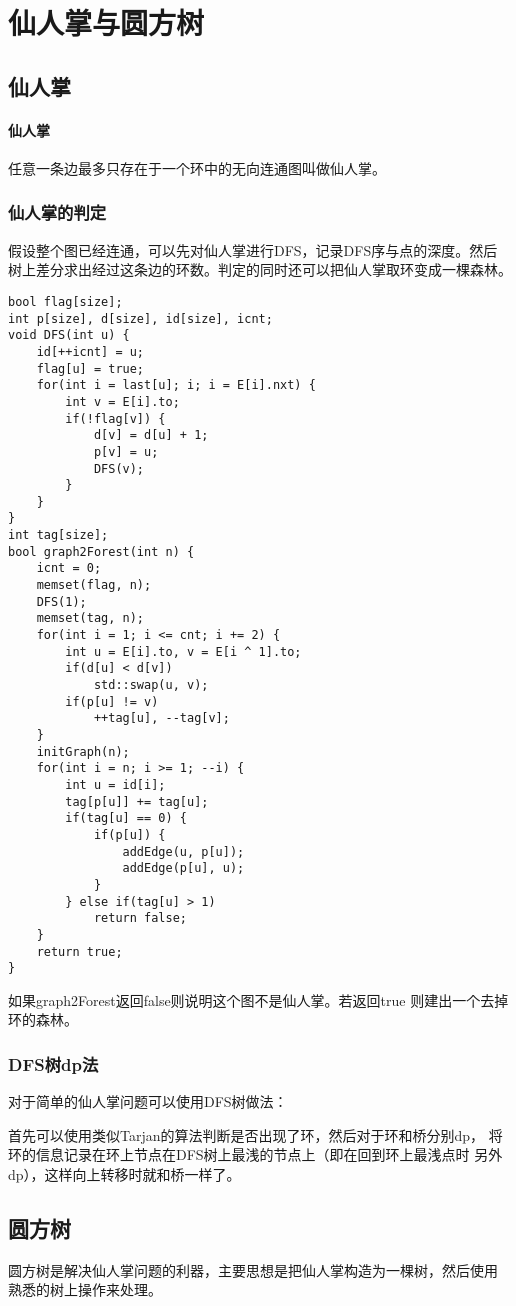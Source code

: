 \section{仙人掌与圆方树}
\subsection{仙人掌}
\paragraph{仙人掌} 任意一条边最多只存在于一个环中的无向连通图叫做仙人掌。
\subsubsection{仙人掌的判定}
假设整个图已经连通，可以先对仙人掌进行DFS，记录DFS序与点的深度。然后
树上差分求出经过这条边的环数。判定的同时还可以把仙人掌取环变成一棵森林。
\begin{lstlisting}
bool flag[size];
int p[size], d[size], id[size], icnt;
void DFS(int u) {
    id[++icnt] = u;
    flag[u] = true;
    for(int i = last[u]; i; i = E[i].nxt) {
        int v = E[i].to;
        if(!flag[v]) {
            d[v] = d[u] + 1;
            p[v] = u;
            DFS(v);
        }
    }
}
int tag[size];
bool graph2Forest(int n) {
    icnt = 0;
    memset(flag, n);
    DFS(1);
    memset(tag, n);
    for(int i = 1; i <= cnt; i += 2) {
        int u = E[i].to, v = E[i ^ 1].to;
        if(d[u] < d[v])
            std::swap(u, v);
        if(p[u] != v)
            ++tag[u], --tag[v];
    }
    initGraph(n);
    for(int i = n; i >= 1; --i) {
        int u = id[i];
        tag[p[u]] += tag[u];
        if(tag[u] == 0) {
            if(p[u]) {
                addEdge(u, p[u]);
                addEdge(p[u], u);
            }
        } else if(tag[u] > 1)
            return false;
    }
    return true;
}
\end{lstlisting}
如果graph2Forest返回false则说明这个图不是仙人掌。若返回true
则建出一个去掉环的森林。
\subsubsection{DFS树dp法}
对于简单的仙人掌问题可以使用DFS树做法：

首先可以使用类似Tarjan的算法判断是否出现了环，然后对于环和桥分别dp，
将环的信息记录在环上节点在DFS树上最浅的节点上（即在回到环上最浅点时
另外dp），这样向上转移时就和桥一样了。
\subsection{圆方树}
圆方树是解决仙人掌问题的利器，主要思想是把仙人掌构造为一棵树，然后使用
熟悉的树上操作来处理。
